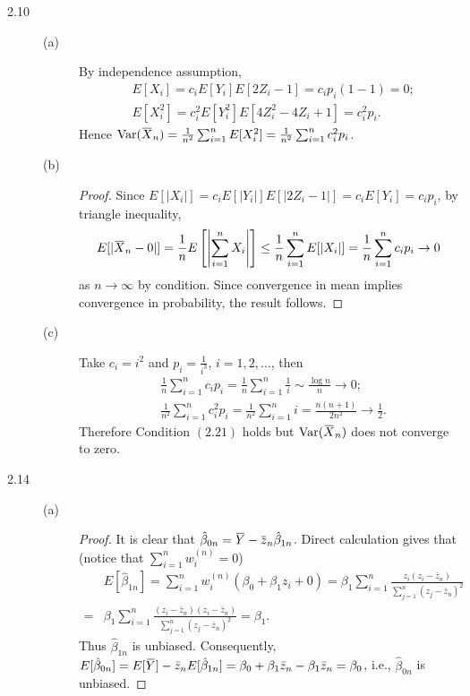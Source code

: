 \documentclass{article}
\newcommand{\overbar}[1]{\mkern 1.5mu\overline{\mkern-1.5mu#1\mkern-1.5mu}\mkern 1.5mu}
\DeclareMathOperator*{\Var}{Var}
\theoremstyle{definition}
\theoremstyle{plain}
\theoremstyle{remark}
\begin{document}
\begin{description}
\item[2.10] 
\begin{description}
\item[(a)] By independence assumption,
\begin{align*}
& E[X_i] = c_iE[Y_i]E[2Z_i - 1] = c_ip_i(1 - 1) = 0; \\
& E[X_i^2] = c_i^2E[Y_i^2]E[4Z_i^2 - 4Z_i + 1] = c_i^2p_i.
\end{align*}
Hence $\Var(\overbar{X}_n) = \frac{1}{n^2}\sum_{i = 1}^n E[X_i^2] = \frac{1}{n^2}\sum_{i = 1}^n c_i^2p_i$.

\item[(b)]
\begin{proof}
Since $E[|X_i|] = c_iE[|Y_i|]E[|2Z_i - 1|] = c_i E[Y_i] = c_ip_i$, by triangle inequality, 
$$E[|\overbar{X}_n - 0|] = \frac{1}{n}E\left[\left|\sum_{i = 1}^n X_i\right|\right] \leq \frac{1}{n}\sum_{i = 1}^n E[|X_i|] = \frac{1}{n}\sum_{i = 1}^n c_ip_i \to 0$$
as $n \to \infty$ by condition. Since convergence in mean implies convergence in probability, the result follows.
\end{proof}

\item[(c)]
Take $c_i = i^2$ and $p_i = \frac{1}{i^3}$, $i = 1, 2, \ldots$, then
\begin{align*}
& \frac{1}{n}\sum_{i = 1}^n c_i p_i = \frac{1}{n} \sum_{i = 1}^n \frac{1}{i} \sim \frac{\log n}{n} \to 0; \\
& \frac{1}{n^2}\sum_{i = 1}^n c_i^2 p_i = \frac{1}{n^2} \sum_{i = 1}^n i = \frac{n(n + 1)}{2n^2} \to \frac{1}{2}.
\end{align*}
Therefore Condition $(2.21)$ holds but $\Var(\overbar{X}_n)$ does not converge to 
zero.
\end{description}

\item[2.14]
\begin{description}
\item[(a)]
\begin{proof}
It is clear that $\hat{\beta}_{0n} = \overbar{Y} - \overbar{z}_n\hat{\beta}_{1n}$.
Direct calculation gives that (notice that $\sum_{i = 1}^n w_i^{(n)} = 0$)
\begin{align*}
& E[\hat{\beta}_{1n}] = \sum_{i = 1}^n w_i^{(n)} (\beta_0 + \beta_1z_i + 0) = \beta_1 \sum_{i = 1}^n \frac{z_i(z_i - \bar{z}_n)}{\sum_{j = 1}^n(z_j - \bar{z}_n)^2} \\
= & \beta_1 \sum_{i = 1}^n \frac{(z_i - \bar{z}_n)(z_i - \bar{z}_n)}{\sum_{j = 1}^n(z_j - \bar{z}_n)^2}  = \beta_1.
\end{align*}
Thus $\hat{\beta}_{1n}$ is unbiased. Consequently, $E[\hat{\beta}_{0n}] = E[\overbar{Y}] - \bar{z}_nE[\hat{\beta}_{1n}] = \beta_0 + \beta_1 \bar{z}_n  - \beta_1\bar{z}_n = \beta_0$, i.e., $\hat{\beta}_{0n}$ is unbiased.
\end{proof}


\end{description}
\end{description}
\end{document}
